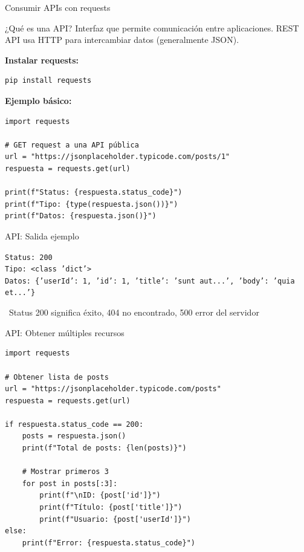 \documentclass{beamer}
\begin{document}
\begin{frame}[fragile]{Consumir APIs con requests \faCloud}
\begin{conceptbox}{¿Qué es una API?}
Interfaz que permite comunicación entre aplicaciones. REST API usa HTTP para intercambiar datos (generalmente JSON).
\end{conceptbox}

\textbf{Instalar requests:}
\begin{lstlisting}[language=bash, numbers=none]
pip install requests
\end{lstlisting}

\vspace{0.2cm}
\textbf{Ejemplo básico:}
\begin{lstlisting}
import requests

# GET request a una API pública
url = "https://jsonplaceholder.typicode.com/posts/1"
respuesta = requests.get(url)

print(f"Status: {respuesta.status_code}")
print(f"Tipo: {type(respuesta.json())}")
print(f"Datos: {respuesta.json()}")
\end{lstlisting}
\end{frame}

\begin{frame}[fragile]{API: Salida ejemplo \faArrowCircleRight}
\begin{tcolorbox}[colback=green!10,colframe=green,title={\small\faArrowCircleRight \ Salida},coltitle=fg0,left=3pt,right=3pt,top=2pt,bottom=2pt,boxsep=1pt]
\tiny\texttt{Status: 200\\
Tipo: <class 'dict'>\\
Datos: \{'userId': 1, 'id': 1, 'title': 'sunt aut...', 'body': 'quia et...'\}}
\end{tcolorbox}

\vspace{0.3cm}
\begin{notebox}
\small\faInfoCircle\ Status 200 significa éxito, 404 no encontrado, 500 error del servidor
\end{notebox}
\end{frame}

\begin{frame}[fragile]{API: Obtener múltiples recursos \faList}
\begin{lstlisting}
import requests

# Obtener lista de posts
url = "https://jsonplaceholder.typicode.com/posts"
respuesta = requests.get(url)

if respuesta.status_code == 200:
    posts = respuesta.json()
    print(f"Total de posts: {len(posts)}")
    
    # Mostrar primeros 3
    for post in posts[:3]:
        print(f"\nID: {post['id']}")
        print(f"Título: {post['title']}")
        print(f"Usuario: {post['userId']}")
else:
    print(f"Error: {respuesta.status_code}")
\end{lstlisting}
\end{frame}
\end{document}
